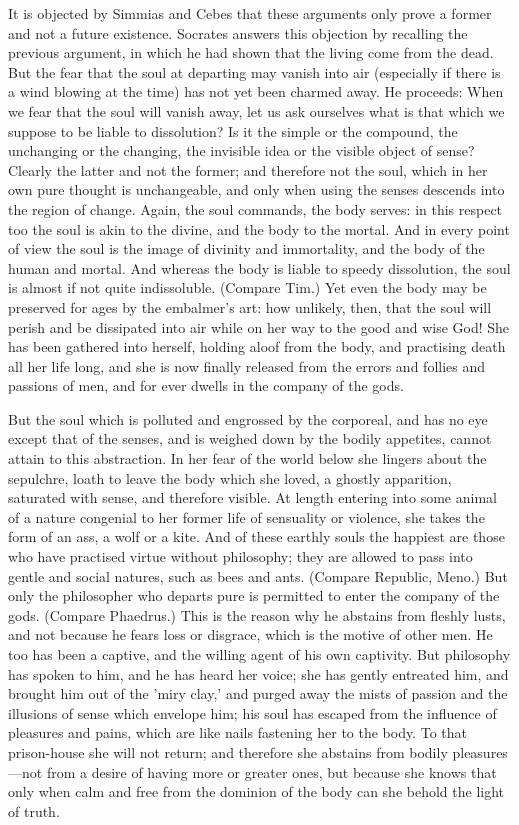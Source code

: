 \documentclass[11pt,letter]{article}
\begin{document}
\par  It is objected by Simmias and Cebes that these arguments only prove a former and not a future existence. Socrates answers this objection by recalling the previous argument, in which he had shown that the living come from the dead. But the fear that the soul at departing may vanish into air (especially if there is a wind blowing at the time) has not yet been charmed away. He proceeds: When we fear that the soul will vanish away, let us ask ourselves what is that which we suppose to be liable to dissolution? Is it the simple or the compound, the unchanging or the changing, the invisible idea or the visible object of sense? Clearly the latter and not the former; and therefore not the soul, which in her own pure thought is unchangeable, and only when using the senses descends into the region of change. Again, the soul commands, the body serves: in this respect too the soul is akin to the divine, and the body to the mortal. And in every point of view the soul is the image of divinity and immortality, and the body of the human and mortal. And whereas the body is liable to speedy dissolution, the soul is almost if not quite indissoluble. (Compare Tim.) Yet even the body may be preserved for ages by the embalmer's art: how unlikely, then, that the soul will perish and be dissipated into air while on her way to the good and wise God! She has been gathered into herself, holding aloof from the body, and practising death all her life long, and she is now finally released from the errors and follies and passions of men, and for ever dwells in the company of the gods.

\par  But the soul which is polluted and engrossed by the corporeal, and has no eye except that of the senses, and is weighed down by the bodily appetites, cannot attain to this abstraction. In her fear of the world below she lingers about the sepulchre, loath to leave the body which she loved, a ghostly apparition, saturated with sense, and therefore visible. At length entering into some animal of a nature congenial to her former life of sensuality or violence, she takes the form of an ass, a wolf or a kite. And of these earthly souls the happiest are those who have practised virtue without philosophy; they are allowed to pass into gentle and social natures, such as bees and ants. (Compare Republic, Meno.) But only the philosopher who departs pure is permitted to enter the company of the gods. (Compare Phaedrus.) This is the reason why he abstains from fleshly lusts, and not because he fears loss or disgrace, which is the motive of other men. He too has been a captive, and the willing agent of his own captivity. But philosophy has spoken to him, and he has heard her voice; she has gently entreated him, and brought him out of the 'miry clay,' and purged away the mists of passion and the illusions of sense which envelope him; his soul has escaped from the influence of pleasures and pains, which are like nails fastening her to the body. To that prison-house she will not return; and therefore she abstains from bodily pleasures—not from a desire of having more or greater ones, but because she knows that only when calm and free from the dominion of the body can she behold the light of truth.
\end{document}
